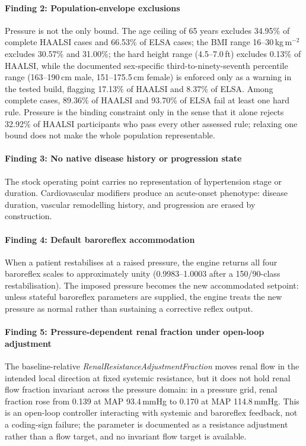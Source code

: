 \documentclass[preprint,12pt,nopreprintline]{elsarticle}
\begin{document}
\paragraph{Finding 2: Population-envelope exclusions} Pressure is not the only bound. The age ceiling of 65 years excludes 34.95\% of complete HAALSI cases and 66.53\% of ELSA cases; the BMI range 16--30\,kg\,m$^{-2}$ excludes 30.57\% and 31.00\%; the hard height range (4.5--7.0\,ft) excludes 0.13\% of HAALSI, while the documented sex-specific third-to-ninety-seventh percentile range (163--190\,cm male, 151--175.5\,cm female) is enforced only as a warning in the tested build, flagging 17.13\% of HAALSI and 8.37\% of ELSA. Among complete cases, 89.36\% of HAALSI and 93.70\% of ELSA fail at least one hard rule. Pressure is the binding constraint only in the sense that it alone rejects 32.92\% of HAALSI participants who pass every other assessed rule; relaxing one bound does not make the whole population representable.

\paragraph{Finding 3: No native disease history or progression state} The stock operating point carries no representation of hypertension stage or duration. Cardiovascular modifiers produce an acute-onset phenotype: disease duration, vascular remodelling history, and progression are erased by construction.

\paragraph{Finding 4: Default baroreflex accommodation} When a patient restabilises at a raised pressure, the engine returns all four baroreflex scales to approximately unity (0.9983--1.0003 after a 150/90-class restabilisation). The imposed pressure becomes the new accommodated setpoint: unless stateful baroreflex parameters are supplied, the engine treats the new pressure as normal rather than sustaining a corrective reflex output.

\paragraph{Finding 5: Pressure-dependent renal fraction under open-loop adjustment} The baseline-relative \emph{RenalResistanceAdjustmentFraction} moves renal flow in the intended local direction at fixed systemic resistance, but it does not hold renal flow fraction invariant across the pressure domain: in a pressure grid, renal fraction rose from 0.139 at MAP 93.4\,mmHg to 0.170 at MAP 114.8\,mmHg. This is an open-loop controller interacting with systemic and baroreflex feedback, not a coding-sign failure; the parameter is documented as a resistance adjustment rather than a flow target, and no invariant flow target is available.
\end{document}
